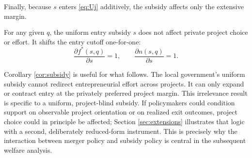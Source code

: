 Finally, because \(s\) enters \eqref{eq:Uj} additively, the subsidy affects only the extensive margin.

\begin{corollary}\label{cor:subsidy}
For any given \(q\), the uniform entry subsidy \(s\) does not affect private project choice or effort.
It shifts the entry cutoff one-for-one:
\begin{equation}
    \frac{\partial f^*(s,q)}{\partial s}=1,
    \qquad
    \frac{\partial n(s,q)}{\partial s}=1.
\end{equation}
\end{corollary}

Corollary \ref{cor:subsidy} is useful for what follows.
The local government's uniform subsidy cannot redirect entrepreneurial effort across projects.
It can only expand or contract entry at the privately preferred project margin.
This irrelevance result is specific to a uniform, project-blind subsidy.
If policymakers could condition support on observable project orientation or on realized exit outcomes, project choice could in principle be affected; Section \ref{sec:extensions} illustrates that logic with a second, deliberately reduced-form instrument.
This is precisely why the interaction between merger policy and subsidy policy is central in the subsequent welfare analysis.
